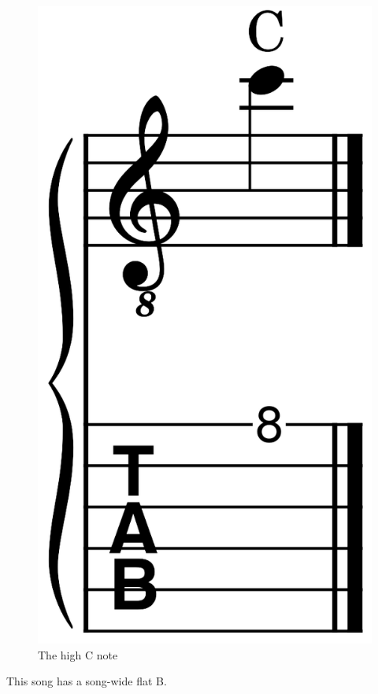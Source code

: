 \begin{figure}[h]
	\centering
	\includegraphics[height=0.12\textheight]{../../MuseScore/Guitar/GuitarNotesHighC.png}
	\caption{The high C note}
	\label{fig:guitar_note_high_c}
\end{figure}


This song has a song-wide flat B.



